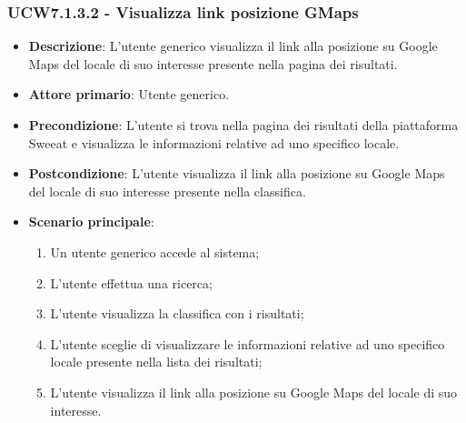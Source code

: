 \subsubsection{UCW7.1.3.2 - Visualizza link posizione GMaps}
\begin{itemize}
	\item \textbf{Descrizione}: L'utente generico visualizza il link alla posizione su Google Maps del locale di suo interesse presente nella pagina dei risultati.
    \item \textbf{Attore primario}: Utente generico.
    \item \textbf{Precondizione}: L’utente si trova nella pagina dei risultati della piattaforma Sweeat e visualizza le informazioni relative ad uno specifico locale.
    \item \textbf{Postcondizione}: L’utente visualizza il link alla posizione su Google Maps del locale di suo interesse presente nella classifica.
    \item \textbf{Scenario principale}: 
    \begin{enumerate}
        \item Un utente generico accede al sistema;
        \item L’utente effettua una ricerca;
        \item L'utente visualizza la classifica con i risultati;
        \item L'utente sceglie di visualizzare le informazioni relative ad uno specifico locale presente nella lista dei risultati;
        \item L'utente visualizza il link alla posizione su Google Maps del locale di suo interesse.
    \end{enumerate}
\end{itemize}